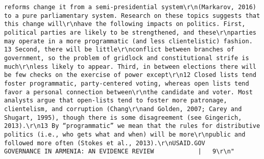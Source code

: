 \documentclass[
]{article}
\begin{document}
\begin{verbatim}
reforms change it from a semi-presidential system\r\n(Markarov, 2016) to a pure parliamentary system. Research on these topics suggests that this change will\r\nhave the following impacts on politics. First, political parties are likely to be strengthened, and these\r\nparties may operate in a more programmatic (and less clientelistic) fashion. 13 Second, there will be little\r\nconflict between branches of government, so the problem of gridlock and constitutional strife is much\r\nless likely to appear. Third, in between elections there will be few checks on the exercise of power except\r\n12 Closed lists tend foster programmatic, party-centered voting, whereas open lists tend favor a personal connection between\r\nthe candidate and voter. Most analysts argue that open-lists tend to foster more patronage, clientelism, and corruption (Chang\r\nand Golden, 2007; Carey and Shugart, 1995), though there is some disagreement (see Gingerich, 2013).\r\n13 By “programmatic” we mean that the rules for distributive politics (i.e., who gets what and when) will be more\r\npublic and followed more often (Stokes et al., 2013).\r\nUSAID.GOV                                                             GOVERNANCE IN ARMENIA: AN EVIDENCE REVIEW            |   9\r\n"                                                                                                                                                                                                                                                                                                                                                                                                                                                                  

\end{verbatim}
\end{document}
